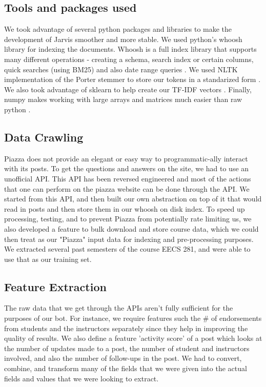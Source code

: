 \documentclass[sigconf]{acmart}
\begin{document}
\subsection{Tools and packages used}
We took advantage of several python packages and libraries to make the development of Jarvis smoother and more stable. We used python's whoosh library for indexing the documents. Whoosh is a full index library that supports many different operations - creating a schema, search index or certain columns, quick searches (using BM25) and also date range queries \cite{pythonwhoosh}. We used NLTK implementation of the Porter stemmer to store our tokens in a standarized form \cite{nltk}. We also took advantage of sklearn to help create our TF-IDF vectors \cite{sklearn}. Finally, numpy makes working with large arrays and matrices much easier than raw python \cite{numpy}.

\subsection{Data Crawling}
Piazza does not provide an elegant or easy way to programmatic-ally interact with its posts. To get the questions and answers on the site, we had to use an unofficial API. This API has been reversed engineered \cite{piazzaapi} and most of the actions that one can perform on the piazza website can be done through the API. We started from this API, and then built our own abstraction on top of it that would read in posts and then store them in our whoosh on disk index. To speed up processing, testing, and to prevent Piazza from potentially rate limiting us, we also developed a feature to bulk download and store course data, which we could then treat as our "Piazza" input data for indexing and pre-processing purposes. We extracted several past semesters of the course EECS 281, and were able to use that as our training set.

\subsection{Feature Extraction}
The raw data that we get through the APIs aren't fully sufficient for the purposes of our bot. For instance, we require features such the \# of endorsements from students and the instructors separately since they help in improving the quality of results. We also define a feature 'activity score' of a post which looks at the number of updates made to a post, the number of student and instructors involved, and also the number of follow-ups in the post. We had to convert, combine, and transform many of the fields that we were given into the actual fields and values that we were looking to extract.
\end{document}
